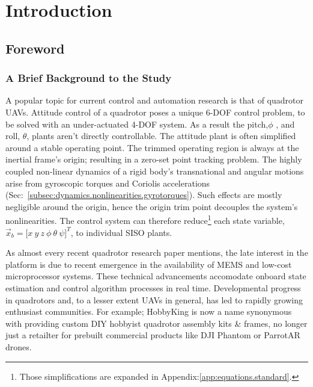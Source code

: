 \chapter{Introduction}
\label{ch:intro}
\section{Foreword}
\label{sec:intro.foreword}
\subsection{A Brief Background to the Study}
\label{subsec:intro.foreword.background}
A popular topic for current control and automation research is that of quadrotor UAVs. Attitude control of a quadrotor poses a unique 6-DOF control problem, to be solved with an under-actuated 4-DOF system. As a result the pitch,$\phi$ , and roll, $\theta$, plants aren't directly controllable. The attitude plant is often simplified around a stable operating point. The trimmed operating region is always at the inertial frame's origin; resulting in a zero-set point tracking problem. The highly coupled non-linear dynamics of a rigid body's transnational and angular motions arise from gyroscopic torques and Coriolis accelerations (Sec:~\ref{subsec:dynamics.nonlinearities.gyrotorques}). Such effects are mostly negligible around the origin, hence the origin trim point decouples the system's nonlinearities. The control system can therefore reduce\footnote{Those simplifications are expanded in Appendix:\ref{app:equations.standard}.} each state variable, $\vec{x}_b=\big[x~y~z~\phi~\theta~\psi\big]^T$, to individual SISO plants.
\par
As almost every recent quadrotor research paper mentions, the late interest in the platform is due to recent emergence in the availability of MEMS and low-cost microprocessor systems. These technical advancements accomodate onboard state estimation and control algorithm processes in real time. Developmental progress in quadrotors and, to a lesser extent UAVs in general, has led to rapidly growing enthusiast communities. For example; HobbyKing\cite{hobbyking} is now a name synonymous with providing custom DIY hobbyist quadrotor assembly kits \& frames, no longer just a retailter for prebuilt commercial products like DJI Phantom\cite{phantom} or ParrotAR\cite{parrotar} drones.
